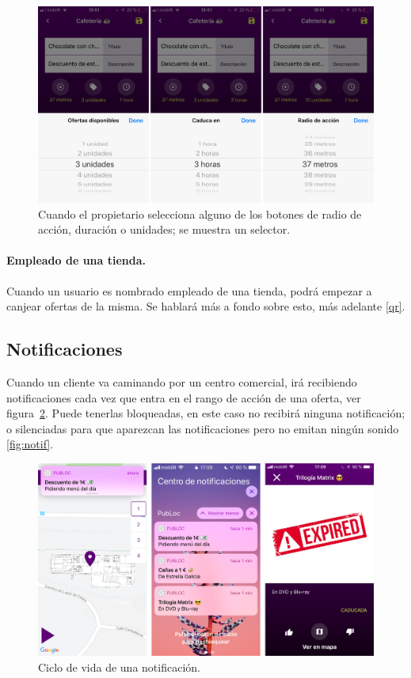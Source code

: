 \begin{figure}[tbp]
\centering
\includegraphics[scale=0.2]{figures/newoffer2.png}
\caption{Cuando el propietario selecciona alguno de los botones de radio de acción, duración o unidades; se muestra un selector.\label{fig:newoffer2}}
\end{figure}

\paragraph{Empleado de una tienda.} Cuando un usuario es nombrado empleado de una tienda, podrá empezar a canjear ofertas de la misma. Se hablará más a fondo sobre esto, más adelante \ref{qr}.


\subsection{Notificaciones}
Cuando un cliente va caminando por un centro comercial, irá recibiendo notificaciones cada vez que entra en el rango de acción de una oferta, ver figura~\ref{fig:notificacion}. Puede tenerlas bloqueadas, en este caso no recibirá ninguna notificación; o silenciadas para que aparezcan las notificaciones pero no emitan ningún sonido \ref{fig:notif}. 

\begin{figure}[tbp]
\centering
\includegraphics[scale=0.2]{figures/notificacion.png}
\caption{Ciclo de vida de una notificación.\label{fig:notificacion}}
\end{figure}

